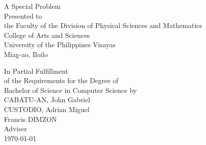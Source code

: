 \begin{titlepage}
\centering


\vspace{1.75cm}
A Special Problem\\
Presented to\\
the Faculty of the Division of Physical Sciences and Mathematics\\
College of Arts and Sciences\\
University of the Philippines Visayas\\
Miag-ao, Iloilo

\vspace{1.75cm}
In Partial Fulfillment\\
of the Requirements for the Degree of\\
Bachelor of Science in Computer Science
\vspace{1.75cm}
by\\

\vspace{1cm}
CABATU-AN, John Gabriel  \\
CUSTODIO, Adrian Miguel  \\


\vspace{1.75cm}
Francis DIMZON\\
Adviser\\

\vspace{1.75cm}
\today
\end{titlepage}
